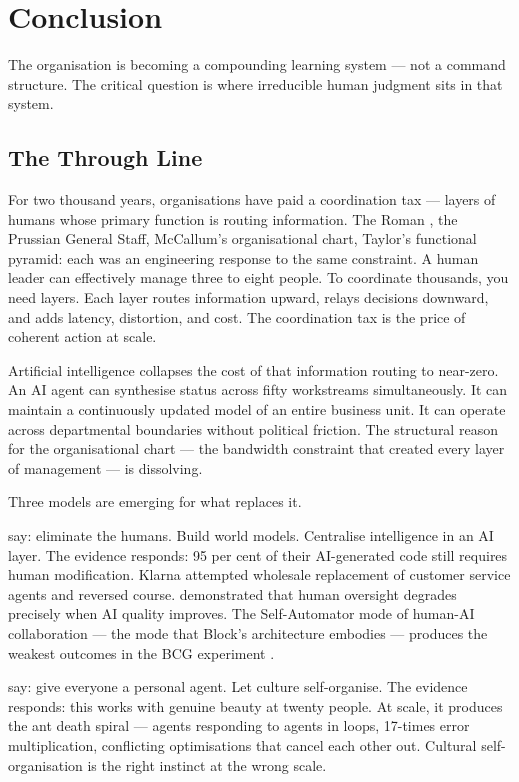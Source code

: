 \chapter{Conclusion}
\label{ch:conclusion}

\epigraph{The organisation is becoming a compounding learning system --- not a command structure. The critical question is where irreducible human judgment sits in that system.}{}

\section{The Through Line}

For two thousand years, organisations have paid a coordination tax --- layers of humans whose primary function is routing information. The Roman , the Prussian General Staff, McCallum's organisational chart, Taylor's functional pyramid: each was an engineering response to the same constraint. A human leader can effectively manage three to eight people. To coordinate thousands, you need layers. Each layer routes information upward, relays decisions downward, and adds latency, distortion, and cost. The coordination tax is the price of coherent action at scale.

Artificial intelligence collapses the cost of that information routing to near-zero. An AI agent can synthesise status across fifty workstreams simultaneously. It can maintain a continuously updated model of an entire business unit. It can operate across departmental boundaries without political friction. The structural reason for the organisational chart --- the bandwidth constraint that created every layer of management --- is dissolving.

Three models are emerging for what replaces it.

\textcite{DorseyBotha2026} say: eliminate the humans. Build world models. Centralise intelligence in an AI layer. The evidence responds: 95 per cent of their AI-generated code still requires human modification. Klarna attempted wholesale replacement of customer service agents and reversed course. \textcite{DellAcqua2023} demonstrated that human oversight degrades precisely when AI quality improves. The Self-Automator mode of human-AI collaboration --- the mode that Block's architecture embodies --- produces the weakest outcomes in the BCG experiment \parencite{Randazzo2024}.

\textcite{Shipper2026} say: give everyone a personal agent. Let culture self-organise. The evidence responds: this works with genuine beauty at twenty people. At scale, it produces the ant death spiral --- agents responding to agents in loops, 17-times error multiplication, conflicting optimisations that cancel each other out. Cultural self-organisation is the right instinct at the wrong scale.


